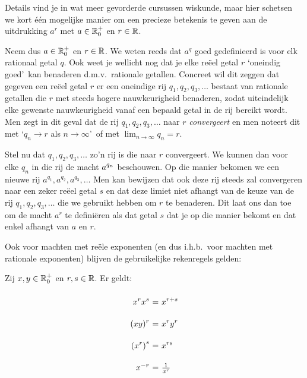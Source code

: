 \documentclass{ximera}
\begin{document}
\begin{uitweiding}
	\begin{expandable}
Details vind je in wat meer gevorderde cursussen wiskunde, maar hier schetsen we kort \'{e}\'{e}n mogelijke manier om een precieze betekenis te geven
aan de uitdrukking $a^r$ met $a\in\mathbb{R}_0^+$ en $r\in\mathbb{R}$.

Neem dus $a\in\mathbb{R}_0^+$ en $r\in\mathbb{R}$. We weten reeds dat $a^q$
goed gedefinieerd is voor elk rationaal getal $q$. Ook weet je
wellicht nog dat je elke re\"eel getal $r$ \lq oneindig goed\rq\
kan benaderen d.m.v.~rationale getallen. Concreet wil dit zeggen
dat gegeven een re\"eel getal $r$ er een oneindige rij
$q_1,q_2,q_3,\ldots$ bestaat van rationale getallen die $r$ met
steeds hogere nauwkeurigheid benaderen, zodat uiteindelijk elke
gewenste nauwkeurigheid vanaf een bepaald getal in de rij bereikt
wordt. Men zegt in dit geval dat de rij $q_1,q_2,q_3,\ldots$ naar
$r$ \emph{convergeert} en men noteert dit met \lq $q_n\to r$ als
$n\to\infty$\rq\ of met $\lim_{n\to\infty}q_n=r$.

Stel nu dat $q_1,q_2,q_3,\ldots$ zo'n rij is die naar $r$
convergeert. We kunnen dan voor elke $q_n$ in die rij de macht
$\displaystyle a^{q_n}$ beschouwen. Op die manier bekomen we een nieuwe rij
$a^{q_1},a^{q_2},a^{q_3},\ldots$ 	
Men kan bewijzen dat ook deze rij steeds
zal convergeren naar een zeker re\"eel getal $s$ en dat deze
limiet niet afhangt van de keuze van de rij $q_1,q_2,q_3,\ldots$
die we gebruikt hebben  om $r$ te benaderen. Dit laat ons dan toe
om de macht $a^r$ te defini\"eren als dat getal $s$ dat je op die
manier bekomt en dat enkel afhangt van $a$ en $r$.
\end{expandable}
\end{uitweiding}

Ook voor machten met re\"ele exponenten (en dus i.h.b.~voor
machten met rationale exponenten) blijven de gebruikelijke
rekenregels  gelden:

\begin{proposition}
	Zij $x,y\in\mathbb{R}_0^+$ en $r,s\in\mathbb{R}$. Er geldt:
	\[
	\arraycolsep=1.4pt\def\arraystretch{2.2}
	\begin{array}{r@{\ =\ }l}
	\ds{x^{r}x^{s}}&\ds{x^{r+s}}\\
	\ds{(xy)^r}&\ds{x^ry^r}\\
	\ds{\left(x^{r}\right)^{s}}&\ds{x^{rs}}\\
	x^{-r} & \frac{1}{x^r} \\
	\end{array}
	\]
\end{proposition}
\end{document}
